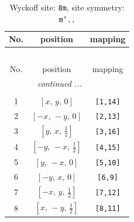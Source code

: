 \documentclass[fleqn,8pt]{jsarticle}
\begin{document}
\begin{longtable}{ccc}
\caption{Wyckoff site: {\tt 8m}, site symmetry: {\tt m'..}}
 \\
 \hline \hline
No. & position & mapping \\ \hline \endfirsthead

\multicolumn{2}{l}{\tablename\ \thetable{}} \\
 \hline \hline
No. & position & mapping \\ \hline \endhead

 \hline \hline
\multicolumn{2}{r}{\footnotesize\it continued ...} \\ \endfoot

 \hline \hline
\multicolumn{2}{r}{} \\ \endlastfoot

1 & $\left[ x,\, y,\, 0 \right]$ & {\tt [1,14]} \\ \hline
2 & $\left[ - x,\, - y,\, 0 \right]$ & {\tt [2,13]} \\ \hline
3 & $\left[ y,\, x,\, \frac{1}{2} \right]$ & {\tt [3,16]} \\ \hline
4 & $\left[ - y,\, - x,\, \frac{1}{2} \right]$ & {\tt [4,15]} \\ \hline
5 & $\left[ y,\, - x,\, 0 \right]$ & {\tt [5,10]} \\ \hline
6 & $\left[ - y,\, x,\, 0 \right]$ & {\tt [6,9]} \\ \hline
7 & $\left[ - x,\, y,\, \frac{1}{2} \right]$ & {\tt [7,12]} \\ \hline
8 & $\left[ x,\, - y,\, \frac{1}{2} \right]$ & {\tt [8,11]} \\
\end{longtable}
\renewcommand{\arraystretch}{1.2}
\end{document}
